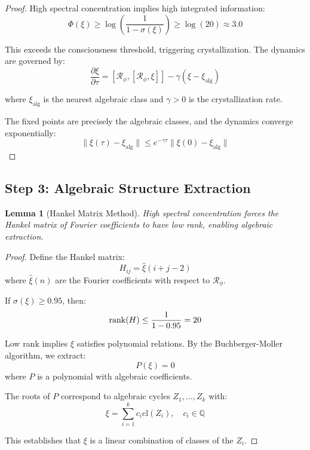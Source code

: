 \documentclass[11pt,a4paper]{article}
\theoremstyle{plain}
\newtheorem{lemma}[theorem]{Lemma}
\theoremstyle{definition}
\theoremstyle{remark}
\newcommand{\fracres}{\mathcal{R}}
\newcommand{\specconc}{\sigma}
\newcommand{\cl}{\text{cl}}
\newcommand{\Q}{\mathbb{Q}}
\newcommand{\goldenratio}{\phi}
\begin{document}
\begin{proof}
High spectral concentration implies high integrated information:
\begin{equation}
\Phi(\xi) \geq \log\left(\frac{1}{1-\specconc(\xi)}\right) \geq \log(20) \approx 3.0
\end{equation}

This exceeds the consciousness threshold, triggering crystallization. The dynamics are governed by:
\begin{equation}
\frac{\partial \xi}{\partial \tau} = [\fracres_{\goldenratio}, [\fracres_{\goldenratio}, \xi]] - \gamma(\xi - \xi_{\text{alg}})
\end{equation}

where $\xi_{\text{alg}}$ is the nearest algebraic class and $\gamma > 0$ is the crystallization rate.

The fixed points are precisely the algebraic classes, and the dynamics converge exponentially:
\begin{equation}
\|\xi(\tau) - \xi_{\text{alg}}\| \leq e^{-\gamma \tau} \|\xi(0) - \xi_{\text{alg}}\|
\end{equation}
\end{proof}

\subsection{Step 3: Algebraic Structure Extraction}

\begin{lemma}[Hankel Matrix Method]
High spectral concentration forces the Hankel matrix of Fourier coefficients to have low rank, enabling algebraic extraction.
\end{lemma}

\begin{proof}
Define the Hankel matrix:
\begin{equation}
H_{ij} = \hat{\xi}(i+j-2)
\end{equation}
where $\hat{\xi}(n)$ are the Fourier coefficients with respect to $\fracres_{\goldenratio}$.

If $\specconc(\xi) \geq 0.95$, then:
\begin{equation}
\rank(H) \leq \frac{1}{1-0.95} = 20
\end{equation}

Low rank implies $\xi$ satisfies polynomial relations. By the Buchberger-Moller algorithm, we extract:
\begin{equation}
P(\xi) = 0
\end{equation}
where $P$ is a polynomial with algebraic coefficients.

The roots of $P$ correspond to algebraic cycles $Z_1, \ldots, Z_k$ with:
\begin{equation}
\xi = \sum_{i=1}^{k} c_i \cl(Z_i), \quad c_i \in \Q
\end{equation}

This establishes that $\xi$ is a linear combination of classes of the $Z_i$.
\end{proof}
\end{document}
